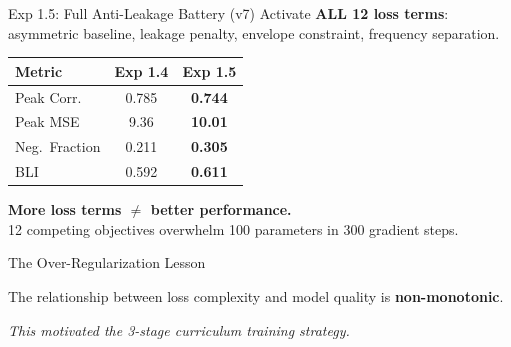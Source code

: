 \documentclass[aspectratio=169, 10pt]{beamer}
\newcommand{\xmark}{\textcolor{warningred}{\ding{55}}}
\begin{document}
\begin{frame}{Exp 1.5: Full Anti-Leakage Battery (v7)}
Activate \textbf{ALL 12 loss terms}: asymmetric baseline, leakage penalty, envelope constraint, frequency separation.

\vspace{0.5em}
\centering
\begin{tabular}{lcc}
\toprule
\textbf{Metric} & \textbf{Exp 1.4} & \textbf{Exp 1.5} \\
\midrule
Peak Corr.      & 0.785 & \textcolor{warningred}{\textbf{0.744}} \xmark \\
Peak MSE        & 9.36  & \textcolor{warningred}{\textbf{10.01}} \xmark \\
Neg.\ Fraction  & 0.211 & \textcolor{warningred}{\textbf{0.305}} \xmark \\
BLI             & 0.592 & \textcolor{warningred}{\textbf{0.611}} \xmark \\
\bottomrule
\end{tabular}

\vspace{0.8em}
\begin{resultbad}
\centering
\textbf{More loss terms $\neq$ better performance.}\\[3pt]
12 competing objectives overwhelm 100 parameters in 300 gradient steps.
\end{resultbad}
\end{frame}

\begin{frame}{The Over-Regularization Lesson}
\centering
{}

\vspace{0.3em}
The relationship between loss complexity and model quality is \textbf{non-monotonic}.

{\small\textit{This motivated the 3-stage curriculum training strategy.}}
\end{frame}
\end{document}
